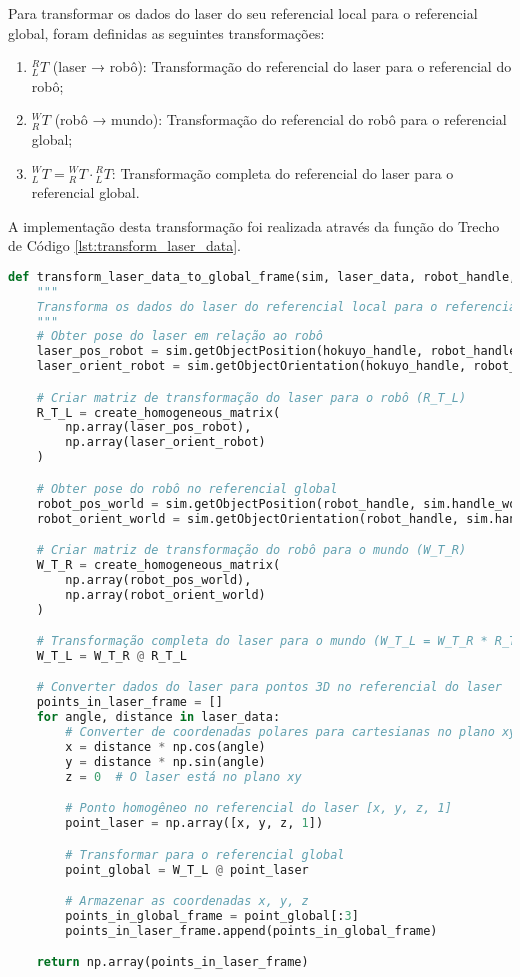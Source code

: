 Para transformar os dados do laser do seu referencial local para o referencial global, foram definidas as seguintes transformações:

\begin{enumerate}
    \item ${^R_L}T$ (laser → robô): Transformação do referencial do laser para o referencial do robô;
    \item ${^W_R}T$ (robô → mundo): Transformação do referencial do robô para o referencial global;
    \item ${^W_L}T = {^W_R}T \cdot {^R_L}T$: Transformação completa do referencial do laser para o referencial global.
\end{enumerate}

A implementação desta transformação foi realizada através da função do Trecho de Código \ref{lst:transform_laser_data}.

\begin{lstlisting}[language=Python, caption=Função para transformar dados do laser para o referencial global., label=lst:transform_laser_data]
def transform_laser_data_to_global_frame(sim, laser_data, robot_handle, hokuyo_handle):
    """
    Transforma os dados do laser do referencial local para o referencial global.
    """
    # Obter pose do laser em relação ao robô
    laser_pos_robot = sim.getObjectPosition(hokuyo_handle, robot_handle)
    laser_orient_robot = sim.getObjectOrientation(hokuyo_handle, robot_handle)

    # Criar matriz de transformação do laser para o robô (R_T_L)
    R_T_L = create_homogeneous_matrix(
        np.array(laser_pos_robot),
        np.array(laser_orient_robot)
    )

    # Obter pose do robô no referencial global
    robot_pos_world = sim.getObjectPosition(robot_handle, sim.handle_world)
    robot_orient_world = sim.getObjectOrientation(robot_handle, sim.handle_world)

    # Criar matriz de transformação do robô para o mundo (W_T_R)
    W_T_R = create_homogeneous_matrix(
        np.array(robot_pos_world),
        np.array(robot_orient_world)
    )

    # Transformação completa do laser para o mundo (W_T_L = W_T_R * R_T_L)
    W_T_L = W_T_R @ R_T_L

    # Converter dados do laser para pontos 3D no referencial do laser
    points_in_laser_frame = []
    for angle, distance in laser_data:
        # Converter de coordenadas polares para cartesianas no plano xy do laser
        x = distance * np.cos(angle)
        y = distance * np.sin(angle)
        z = 0  # O laser está no plano xy

        # Ponto homogêneo no referencial do laser [x, y, z, 1]
        point_laser = np.array([x, y, z, 1])

        # Transformar para o referencial global
        point_global = W_T_L @ point_laser

        # Armazenar as coordenadas x, y, z
        points_in_global_frame = point_global[:3]
        points_in_laser_frame.append(points_in_global_frame)

    return np.array(points_in_laser_frame)
\end{lstlisting}

